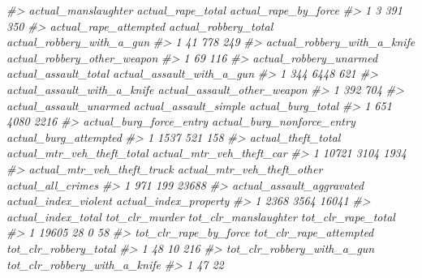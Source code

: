 \documentclass[
  12pt,
]{book}
\newenvironment{Shaded}{\begin{snugshade}}{\end{snugshade}}
\newcommand{\CommentTok}[1]{\textcolor[rgb]{0.37,0.37,0.37}{\textit{#1}}}
\begin{document}
\begin{Shaded}
\begin{Highlighting}[]
\CommentTok{\#\textgreater{}   actual\_manslaughter actual\_rape\_total actual\_rape\_by\_force}
\CommentTok{\#\textgreater{} 1                   3               391                  350}
\CommentTok{\#\textgreater{}   actual\_rape\_attempted actual\_robbery\_total actual\_robbery\_with\_a\_gun}
\CommentTok{\#\textgreater{} 1                    41                  778                       249}
\CommentTok{\#\textgreater{}   actual\_robbery\_with\_a\_knife actual\_robbery\_other\_weapon}
\CommentTok{\#\textgreater{} 1                          69                         116}
\CommentTok{\#\textgreater{}   actual\_robbery\_unarmed actual\_assault\_total actual\_assault\_with\_a\_gun}
\CommentTok{\#\textgreater{} 1                    344                 6448                       621}
\CommentTok{\#\textgreater{}   actual\_assault\_with\_a\_knife actual\_assault\_other\_weapon}
\CommentTok{\#\textgreater{} 1                         392                         704}
\CommentTok{\#\textgreater{}   actual\_assault\_unarmed actual\_assault\_simple actual\_burg\_total}
\CommentTok{\#\textgreater{} 1                    651                  4080              2216}
\CommentTok{\#\textgreater{}   actual\_burg\_force\_entry actual\_burg\_nonforce\_entry actual\_burg\_attempted}
\CommentTok{\#\textgreater{} 1                    1537                        521                   158}
\CommentTok{\#\textgreater{}   actual\_theft\_total actual\_mtr\_veh\_theft\_total actual\_mtr\_veh\_theft\_car}
\CommentTok{\#\textgreater{} 1              10721                       3104                     1934}
\CommentTok{\#\textgreater{}   actual\_mtr\_veh\_theft\_truck actual\_mtr\_veh\_theft\_other actual\_all\_crimes}
\CommentTok{\#\textgreater{} 1                        971                        199             23688}
\CommentTok{\#\textgreater{}   actual\_assault\_aggravated actual\_index\_violent actual\_index\_property}
\CommentTok{\#\textgreater{} 1                      2368                 3564                 16041}
\CommentTok{\#\textgreater{}   actual\_index\_total tot\_clr\_murder tot\_clr\_manslaughter tot\_clr\_rape\_total}
\CommentTok{\#\textgreater{} 1              19605             28                    0                 58}
\CommentTok{\#\textgreater{}   tot\_clr\_rape\_by\_force tot\_clr\_rape\_attempted tot\_clr\_robbery\_total}
\CommentTok{\#\textgreater{} 1                    48                     10                   216}
\CommentTok{\#\textgreater{}   tot\_clr\_robbery\_with\_a\_gun tot\_clr\_robbery\_with\_a\_knife}
\CommentTok{\#\textgreater{} 1                         47                           22}

\end{Highlighting}
\end{Shaded}
\end{document}

